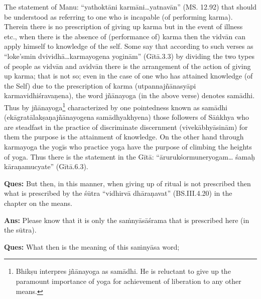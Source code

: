 The statement of Manu: “yathoktāni karmāni…yatnavān” (MS. 12.92) that should be understood as referring to one who is incapable (of performing karma). Therein there is no prescription of giving up karma but in the event of illness etc., when there is the absence of (performance of) karma then the vidvān can apply himself to knowledge of the self. Some say that according to such verses as “loke’smin dvividhā…karmayogena yoginām” (Gītā.3.3) by dividing the two types of people as vidvān and avidvān there is the arrangement of the action of giving up karma; that is not so; even in the case of one who has attained knowledge (of the Self)  due to the prescription of karma (utpannajñānasyāpi karmavidhiśravaṇena), the word jñānayoga (in the above verse) denotes samādhi. Thus by jñānayoga\footnote{Bhikṣu interpres jñānayoga as samādhi. He is reluctant to give up the paramount importance of yoga for achievement of liberation to any other means.} characterized by one pointedness known as samādhi (ekāgratālakṣaṇajñānayogena samādhyakhyena) those followers of Sāṅkhya who are steadfast in the practice of discriminate discernment (vivekābhyāsinām) for them the purpose is the attainment of knowledge. On the other hand through karmayoga the yogīs who practice yoga have the purpose of climbing the heights of yoga. Thus there is the  statement in the Gītā: “ārurukśormuneryogam… śamaḥ kāraṇamucyate” (Gītā.6.3).

\textbf{Ques:} But then, in this manner, when giving up of ritual is not prescribed then what is prescribed by the śūtra “vidhirvā dhāraṇavat” (BS.III.4.20) in the chapter on the means.

\textbf{Ans:} Please know that it is only the saṁnyāsāśrama that is prescribed here (in the sūtra). 

\textbf{Ques:} What then is the meaning of this saṁnyāsa word; 

